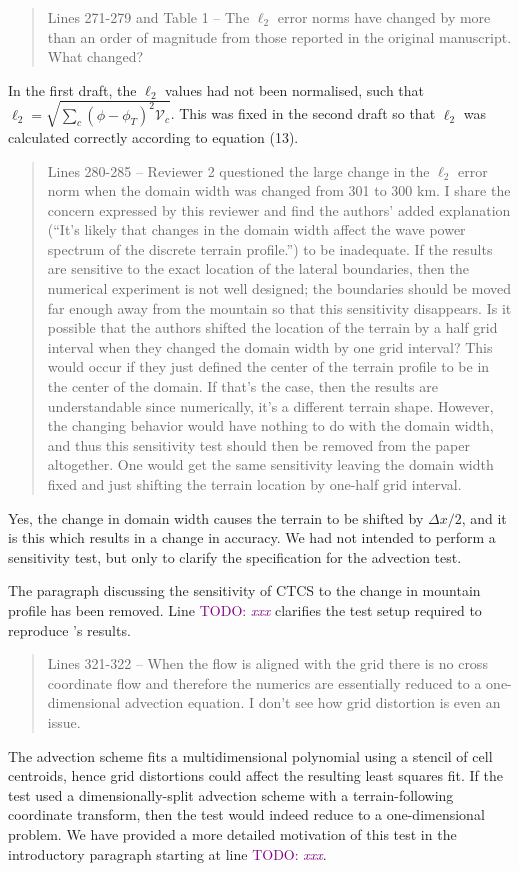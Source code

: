 \documentclass{article}
\newcommand{\TODO}[1]{\textcolor{purple}{TODO: \emph{#1}}}
\begin{document}
\begin{quotation}
 Lines 271-279 and Table 1 -- The $\ell_2$ error norms have changed by more than an order  of magnitude from those reported in the original manuscript. What changed?
\end{quotation}
In the first draft, the $\ell_2$ values had not been normalised, such that $\ell_2 = \sqrt{\sum_c \left(\phi - \phi_T\right)^2 \mathcal{V}_c}$.  This was fixed in the second draft so that $\ell_2$ was calculated correctly according to equation (13).
\begin{quotation}
 Lines 280-285 -- Reviewer 2 questioned the large change in the $\ell_2$ error norm when 
 the domain width was changed from 301 to 300 km. I share the concern expressed 
 by this reviewer and find the authors' added explanation (``It's likely that changes in 
 the domain width affect the wave power spectrum of the discrete terrain profile.'') to 
 be inadequate. If the results are sensitive to the exact location of the lateral 
 boundaries, then the numerical experiment is not well designed; the boundaries 
 should be moved far enough away from the mountain so that this sensitivity 
 disappears.  Is it possible that the authors shifted the location of the terrain by a half 
 grid interval when they changed the domain width by one grid interval? This would 
 occur if they just defined the center of the terrain profile to be in the center of the 
 domain. If that’s the case, then the results are understandable since numerically, it's a 
 different terrain shape. However, the changing behavior would have nothing to do 
 with the domain width, and thus this sensitivity test should then be removed from 
 the paper altogether. One would get the same sensitivity leaving the domain width 
 fixed and just shifting the terrain location by one-half grid interval.  
\end{quotation}
Yes, the change in domain width causes the terrain to be shifted by $\Delta x / 2$, and it is this which results in a change in accuracy.  We had not intended to perform a sensitivity test, but only to clarify the specification for the \citet{schaer2002} advection test.

The paragraph discussing the sensitivity of CTCS to the change in mountain profile has been removed.  Line \TODO{xxx} clarifies the test setup required to reproduce \citet{schaer2002}'s results.

\begin{quotation}
 Lines 321-322 -- When the flow is aligned with the grid there is no cross coordinate 
 flow and therefore the numerics are essentially reduced to a one-dimensional 
 advection equation. I don't see how grid distortion is even an issue. 
\end{quotation}
The advection scheme fits a multidimensional polynomial using a stencil of cell centroids, hence grid distortions could affect the resulting least squares fit.  If the test used a dimensionally-split advection scheme with a terrain-following coordinate transform, then the test would indeed reduce to a one-dimensional problem.  We have provided a more detailed motivation of this test in the introductory paragraph starting at line \TODO{xxx}.
\end{document}
